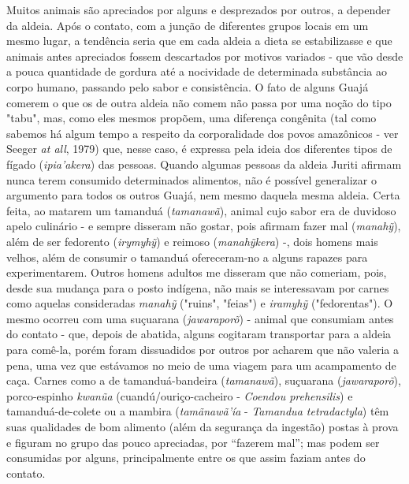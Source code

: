 Muitos animais são apreciados por alguns e desprezados por outros, a
depender da aldeia. Após o contato, com a junção de diferentes grupos
locais em um mesmo lugar, a tendência seria que em cada aldeia a dieta
se estabilizasse e que animais antes apreciados fossem descartados por
motivos variados - que vão desde a pouca quantidade de gordura até a
nocividade de determinada substância ao corpo humano, passando pelo
sabor e consistência. O fato de alguns Guajá comerem o que os de outra
aldeia não comem não passa por uma noção do tipo "tabu", mas, como eles
mesmos propõem, uma diferença congênita (tal como sabemos há algum tempo
a respeito da corporalidade dos povos amazônicos - ver Seeger \emph{at
all}, 1979) que, nesse caso, é expressa pela ideia dos diferentes tipos
de fígado (\emph{ipia'akera}) das pessoas. Quando algumas pessoas da
aldeia Juriti afirmam nunca terem consumido determinados alimentos, não
é possível generalizar o argumento para todos os outros Guajá, nem mesmo
daquela mesma aldeia. Certa feita, ao matarem um tamanduá
(\emph{tamanawã}), animal cujo sabor era de duvidoso apelo culinário - e
sempre disseram não gostar, pois afirmam fazer mal (\emph{manahỹ}), além
de ser fedorento (\emph{irymyhỹ}) e reimoso (\emph{manahỹkera}) -, dois
homens mais velhos, além de consumir o tamanduá ofereceram-no a alguns
rapazes para experimentarem. Outros homens adultos me disseram que não
comeriam, pois, desde sua mudança para o posto indígena, não mais se
interessavam por carnes como aquelas consideradas \emph{manahỹ}
("ruins", "feias") e \emph{iramyhỹ} ("fedorentas"). O mesmo ocorreu com
uma suçuarana (\emph{jawaraporõ}) - animal que consumiam antes do
contato - que, depois de abatida, alguns cogitaram transportar para a
aldeia para comê-la, porém foram dissuadidos por outros por acharem que
não valeria a pena, uma vez que estávamos no meio de uma viagem para um
acampamento de caça. Carnes como a de tamanduá-bandeira
(\emph{tamanawã}), suçuarana (\emph{jawaraporõ}), porco-espinho
\emph{kwanũa} (cuandú/ouriço-cacheiro - \emph{Coendou prehensilis}) e
tamanduá-de-colete ou a mambira (\emph{tamãnawã'ía} - \emph{Tamandua
tetradactyla}) têm suas qualidades de bom alimento (além da segurança da
ingestão) postas à prova e figuram no grupo das pouco apreciadas, por
``fazerem mal''; mas podem ser consumidas por alguns, principalmente
entre os que assim faziam antes do contato.

